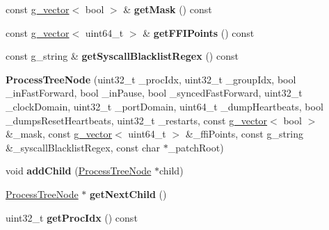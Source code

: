\begin{DoxyCompactItemize}
\item 
\hypertarget{classProcessTreeNode_aabd4c5d6d0999280747eda6333e0a8a1}{const \hyperlink{classg__vector}{g\-\_\-vector}$<$ bool $>$ \& {\bfseries get\-Mask} () const }\label{classProcessTreeNode_aabd4c5d6d0999280747eda6333e0a8a1}

\item 
\hypertarget{classProcessTreeNode_a74efcea43d5a091816035483cb98e8b7}{const \hyperlink{classg__vector}{g\-\_\-vector}$<$ uint64\-\_\-t $>$ \& {\bfseries get\-F\-F\-I\-Points} () const }\label{classProcessTreeNode_a74efcea43d5a091816035483cb98e8b7}

\item 
\hypertarget{classProcessTreeNode_a6c3b641be0e6727060ef2723fd2d8435}{const g\-\_\-string \& {\bfseries get\-Syscall\-Blacklist\-Regex} () const }\label{classProcessTreeNode_a6c3b641be0e6727060ef2723fd2d8435}

\item 
\hypertarget{classProcessTreeNode_af0e182f32f66ca90d7db83c6a51df5bb}{{\bfseries Process\-Tree\-Node} (uint32\-\_\-t \-\_\-proc\-Idx, uint32\-\_\-t \-\_\-group\-Idx, bool \-\_\-in\-Fast\-Forward, bool \-\_\-in\-Pause, bool \-\_\-synced\-Fast\-Forward, uint32\-\_\-t \-\_\-clock\-Domain, uint32\-\_\-t \-\_\-port\-Domain, uint64\-\_\-t \-\_\-dump\-Heartbeats, bool \-\_\-dumps\-Reset\-Heartbeats, uint32\-\_\-t \-\_\-restarts, const \hyperlink{classg__vector}{g\-\_\-vector}$<$ bool $>$ \&\-\_\-mask, const \hyperlink{classg__vector}{g\-\_\-vector}$<$ uint64\-\_\-t $>$ \&\-\_\-ffi\-Points, const g\-\_\-string \&\-\_\-syscall\-Blacklist\-Regex, const char $\ast$\-\_\-patch\-Root)}\label{classProcessTreeNode_af0e182f32f66ca90d7db83c6a51df5bb}

\item 
\hypertarget{classProcessTreeNode_a9d6d52ef8c9bc5222b434db0dc7e5b30}{void {\bfseries add\-Child} (\hyperlink{classProcessTreeNode}{Process\-Tree\-Node} $\ast$child)}\label{classProcessTreeNode_a9d6d52ef8c9bc5222b434db0dc7e5b30}

\item 
\hypertarget{classProcessTreeNode_a7adddbecca58d0bdf6937e6019e47447}{\hyperlink{classProcessTreeNode}{Process\-Tree\-Node} $\ast$ {\bfseries get\-Next\-Child} ()}\label{classProcessTreeNode_a7adddbecca58d0bdf6937e6019e47447}

\item 
\hypertarget{classProcessTreeNode_aba159f52890875d4869f002c3748a8db}{uint32\-\_\-t {\bfseries get\-Proc\-Idx} () const }\label{classProcessTreeNode_aba159f52890875d4869f002c3748a8db}


\end{DoxyCompactItemize}
